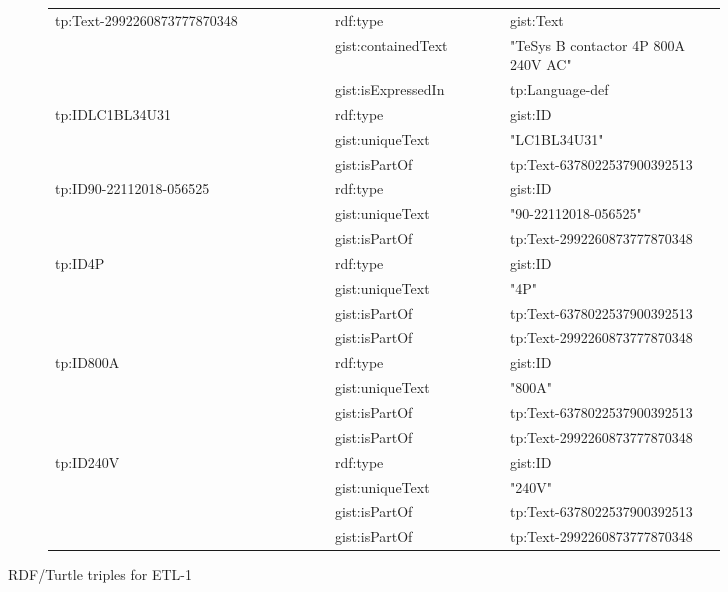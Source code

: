 \begin{figure}[H]
\ContinuedFloat
\begin{subfigure}{\textwidth}
\centering

  \begin{table}[H]
	  \begin{tabular}{|p{0.40\linewidth}|p{0.25\linewidth}|p{0.31\linewidth}|}
		  \hline
		  \multirow{3}{*}{tp:Text-2992260873777870348} & rdf:type & gist:Text \\
		   & gist:containedText & "TeSys B contactor 4P 800A 240V AC" \\
		   & gist:isExpressedIn & tp:Language-def \\
		  \hline
		  \multirow{3}{*}{tp:IDLC1BL34U31} & rdf:type & gist:ID \\
		   & gist:uniqueText & "LC1BL34U31" \\
		   & gist:isPartOf & tp:Text-6378022537900392513 \\
		  \hline
		  \multirow{3}{*}{tp:ID90-22112018-056525} & rdf:type & gist:ID \\
		   & gist:uniqueText & "90-22112018-056525" \\
		   & gist:isPartOf & tp:Text-2992260873777870348 \\
		  \hline
		  \multirow{3}{*}{tp:ID4P} & rdf:type & gist:ID \\
		   & gist:uniqueText & "4P" \\
		   & gist:isPartOf & tp:Text-6378022537900392513 \\
		   & gist:isPartOf & tp:Text-2992260873777870348 \\
		  \hline
		  \multirow{3}{*}{tp:ID800A} & rdf:type & gist:ID \\
		   & gist:uniqueText & "800A" \\
		   & gist:isPartOf & tp:Text-6378022537900392513 \\
		   & gist:isPartOf & tp:Text-2992260873777870348 \\
		  \hline
		  \multirow{3}{*}{tp:ID240V} & rdf:type & gist:ID \\
		   & gist:uniqueText & "240V" \\
		   & gist:isPartOf & tp:Text-6378022537900392513 \\
		   & gist:isPartOf & tp:Text-2992260873777870348 \\
		  \hline
	  \end{tabular}
  \end{table}

\end{subfigure}
\caption{RDF/Turtle triples for ETL-1}
\label{fig:rdf_ttl_example_full}
\end{figure}

